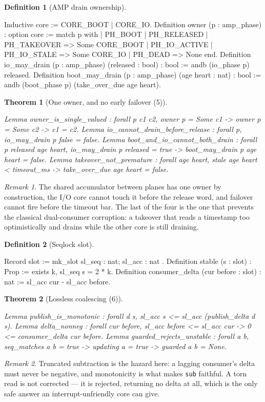 \documentclass[10pt,journal,compsoc,twocolumn]{article}
\newtheorem{theorem}{Theorem}[section]
\theoremstyle{definition}
\newtheorem{definition}{Definition}[section]
\theoremstyle{remark}
\newtheorem{remark}{Remark}[section]
\theoremstyle{plain}
\newcommand{\ctr}[1]{\texttt{#1}}
\begin{document}
\begin{definition}[AMP drain ownership]
\begin{coc}
Inductive core := CORE_BOOT | CORE_IO.
Definition owner (p : amp_phase) : option core :=
  match p with
  | PH_BOOT | PH_RELEASED | PH_TAKEOVER => Some CORE_BOOT
  | PH_IO_ACTIVE | PH_IO_STALE          => Some CORE_IO
  | PH_DEAD                             => None
  end.
Definition io_may_drain (p : amp_phase) (released : bool) : bool :=
  andb (io_phase p) released.
Definition boot_may_drain (p : amp_phase) (age heart : nat) : bool :=
  andb (boot_phase p) (take_over_due age heart).
\end{coc}\end{definition}
\begin{theorem}[One owner, and no early failover (5)]
\begin{coc}
Lemma owner_is_single_valued : forall p c1 c2,
  owner p = Some c1 -> owner p = Some c2 -> c1 = c2.
Lemma io_cannot_drain_before_release : forall p, io_may_drain p false = false.
Lemma boot_and_io_cannot_both_drain : forall p released age heart,
  io_may_drain p released = true -> boot_may_drain p age heart = false.
Lemma takeover_not_premature : forall age heart,
  stale age heart < timeout_ms -> take_over_due age heart = false.
\end{coc}\end{theorem}
\begin{remark}
The shared accumulator between planes has one owner by construction, the I/O
core cannot touch it before the release word, and failover cannot fire before the
timeout bar. The last of the four is the one that prevents the classical
dual-consumer corruption: a takeover that reads a timestamp too optimistically
and drains while the other core is still draining.
\end{remark}

\begin{definition}[Seqlock slot]
\begin{coc}
Record slot := mk_slot { sl_seq : nat; sl_acc : nat }.
Definition stable (s : slot) : Prop := exists k, sl_seq s = 2 * k.
Definition consumer_delta (cur before : slot) : nat := sl_acc cur - sl_acc before.
\end{coc}\end{definition}
\begin{theorem}[Lossless coalescing (6)]
\begin{coc}
Lemma publish_is_monotonic : forall d s, sl_acc s <= sl_acc (publish_delta d s).
Lemma delta_nonneg : forall cur before, sl_acc before <= sl_acc cur ->
  0 <= consumer_delta cur before.
Lemma guarded_rejects_unstable : forall a b, seq_matches a b = true ->
  updating a = true -> guarded a b = None.
\end{coc}\end{theorem}
\begin{remark}
Truncated subtraction is the hazard here: a lagging consumer's delta must never
be negative, and monotonicity is what makes \ctr{sub} faithful. A torn read is
not corrected --- it is rejected, returning no delta at all, which is the only
safe answer an interrupt-unfriendly core can give.
\end{remark}
\end{document}
